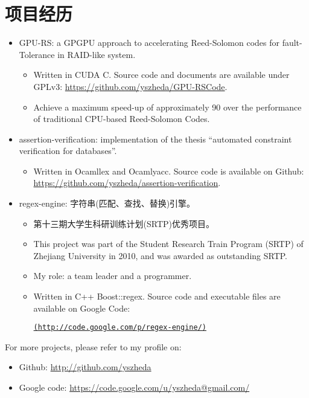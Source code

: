 \documentclass[letterpaper]{article}
\begin{document}
\section*{项目经历}
\begin{itemize}
  \item GPU-RS: a GPGPU approach to accelerating Reed-Solomon codes for fault-Tolerance in RAID-like system.
	\begin{itemize}
	  \item Written in CUDA C. Source code and documents are available under GPLv3: \url{https://github.com/yszheda/GPU-RSCode}.
	  \item Achieve a maximum speed-up of approximately 90 over the performance of traditional CPU-based Reed-Solomon Codes.
	\end{itemize}
  \item assertion-verification: implementation of the thesis ``automated constraint verification for databases''.
	\begin{itemize}
	  \item Written in Ocamllex and Ocamlyacc. Source code is available on Github: \\ \url{https://github.com/yszheda/assertion-verification}.
	\end{itemize}
  \item regex-engine: 字符串(匹配、查找、替换)引擎。
    \begin{itemize}
    \item 第十三期大学生科研训练计划(SRTP)优秀项目。
	  \item This project was part of the Student Research Train Program (SRTP) of Zhejiang University in 2010, and was awarded as outstanding SRTP.
	\item My role: a team leader and a programmer.
	\item Written in C++ Boost::regex. Source code and executable files are available on Google Code:

	  \href{http://code.google.com/p/regex-engine/}{\tt (http://code.google.com/p/regex-engine/)}
	\end{itemize}

\end{itemize}

For more projects, please refer to my profile on:
\begin{itemize}
  \item Github: \url{http://github.com/yszheda} 
  \item Google code: \url{https://code.google.com/u/yszheda@gmail.com/}
\end{itemize}
\end{document}
